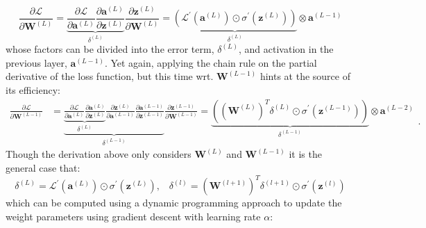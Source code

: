 \documentclass[a4paper,11pt]{article}
\begin{document}
\begin{equation} \label{eq:dLdW1}
  \frac{\partial \mathcal{L}}{\partial \mathbf{W}^{(L)}}  
= \underbrace{
    \frac{\partial \mathcal{L}}{\partial \mathbf{a}^{(L)}}
    \frac{\partial \mathbf{a}^{(L)}}{\partial \mathbf{z}^{(L)}}
  }_ {\delta^{(L)}}
  \frac{\partial \mathbf{z}^{(L)}}{\partial \mathbf{W}^{(L)}}
= \underbrace{
    \left(
      \mathcal{L}^\prime (\mathbf{a}^{(L)}) \odot \sigma^\prime(\mathbf{z}^{(L)})
    \right)
  }_{\delta^{(L)}}  \otimes
 \mathbf{a}^{(L-1)}
\end{equation}
whose factors can be divided into the error term, $\delta^{(L)}$, and activation in the previous layer, $\mathbf{a}^{(L-1)}$. Yet again, applying the chain rule on the partial derivative of the loss function, but this time wrt. $\mathbf{W}^{(L-1)}$ hints at the source of its efficiency:
\begin{equation}
\begin{split}
    \frac{\partial \mathcal{L}}{\partial \mathbf{W}^{(L-1)}}
 &= \underbrace{
   \underbrace{
   \frac{\partial \mathcal{L}}{\partial \mathbf{a}^{(L)}}
   \frac{\partial \mathbf{a}^{(L)}}{\partial \mathbf{z}^{(L)}}
 }_{\delta^{(L)}}
   \frac{\partial \mathbf{z}^{(L)}}{\partial \mathbf{a}^{(L-1)}}
   \frac{\partial \mathbf{a}^{(L-1)}}{\partial \mathbf{z}^{(L-1)}}
 }_{\delta^{(L-1)}}
   \frac{\partial \mathbf{z}^{(L-1)}}{\partial \mathbf{W}^{(L-1)}}
  = \underbrace{
    \left(
      (\mathbf{W}^{(L)})^T \delta^{(L)} \odot \sigma^\prime(\mathbf{z}^{(L-1)})
    \right)
  }_{\delta^{(L-1)}} \otimes
  \mathbf{a}^{(L-2)}
\end{split}.
\end{equation}
Though the derivation above only considers $\mathbf{W}^{(L)}$ and $\mathbf{W}^{(L-1)}$ it is the general case that:
\begin{equation} \label{eq:delta-terms}
  \delta^{(L)} = \mathcal{L}^\prime (\mathbf{a}^{(L)}) \odot \sigma^\prime(\mathbf{z}^{(L)}), 
  \hspace{10pt}
  \delta^{(l)} =  (\mathbf{W}^{(l+1)})^T\delta^{(l+1)} \odot \sigma^\prime(\mathbf{z}^{(l)})
\end{equation}
which can be computed using a dynamic programming approach to update the weight parameters using gradient descent with learning rate $\alpha$:
\end{document}
